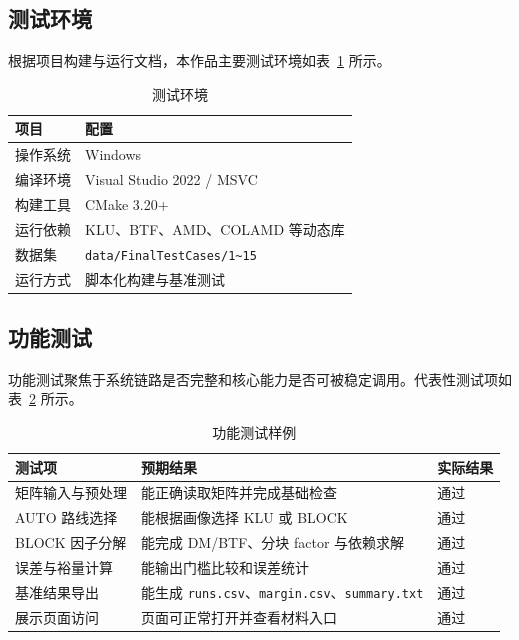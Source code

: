 \documentclass[12pt,a4paper,fontset=none]{ctexart}
\begin{document}
\subsection{测试环境}

根据项目构建与运行文档，本作品主要测试环境如表~\ref{tab:env} 所示。

\begin{table}[H]
\centering
\caption{测试环境}
\label{tab:env}
\begin{tabular}{p{4cm}p{8cm}}
\toprule
项目 & 配置 \\
\midrule
操作系统 & Windows \\
编译环境 & Visual Studio 2022 / MSVC \\
构建工具 & CMake 3.20+ \\
运行依赖 & KLU、BTF、AMD、COLAMD 等动态库 \\
数据集 & \texttt{data/FinalTestCases/1\textasciitilde 15} \\
运行方式 & 脚本化构建与基准测试 \\
\bottomrule
\end{tabular}
\end{table}

\subsection{功能测试}

功能测试聚焦于系统链路是否完整和核心能力是否可被稳定调用。代表性测试项如表~\ref{tab:functiontest} 所示。

\begin{table}[H]
\centering
\caption{功能测试样例}
\label{tab:functiontest}
\begin{tabular}{p{3.8cm}p{4.0cm}p{3.8cm}}
\toprule
测试项 & 预期结果 & 实际结果 \\
\midrule
矩阵输入与预处理 & 能正确读取矩阵并完成基础检查 & 通过 \\
AUTO 路线选择 & 能根据画像选择 KLU 或 BLOCK & 通过 \\
BLOCK 因子分解 & 能完成 DM/BTF、分块 factor 与依赖求解 & 通过 \\
误差与裕量计算 & 能输出门槛比较和误差统计 & 通过 \\
基准结果导出 & 能生成 \texttt{runs.csv}、\texttt{margin.csv}、\texttt{summary.txt} & 通过 \\
展示页面访问 & 页面可正常打开并查看材料入口 & 通过 \\
\bottomrule
\end{tabular}
\end{table}
\end{document}
